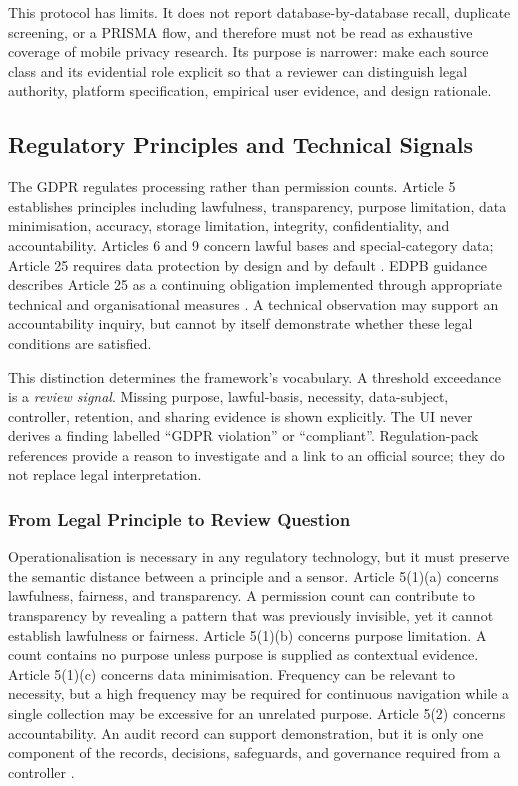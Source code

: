 This protocol has limits. It does not report database-by-database recall, duplicate screening, or a PRISMA flow, and therefore must not be read as exhaustive coverage of mobile privacy research. Its purpose is narrower: make each source class and its evidential role explicit so that a reviewer can distinguish legal authority, platform specification, empirical user evidence, and design rationale.

\subsection{Regulatory Principles and Technical Signals}

The GDPR regulates processing rather than permission counts. Article 5 establishes principles including lawfulness, transparency, purpose limitation, data minimisation, accuracy, storage limitation, integrity, confidentiality, and accountability. Articles 6 and 9 concern lawful bases and special-category data; Article 25 requires data protection by design and by default \cite{eurlex2016}. EDPB guidance describes Article 25 as a continuing obligation implemented through appropriate technical and organisational measures \cite{edpb2019}. A technical observation may support an accountability inquiry, but cannot by itself demonstrate whether these legal conditions are satisfied.

This distinction determines the framework's vocabulary. A threshold exceedance is a \emph{review signal}. Missing purpose, lawful-basis, necessity, data-subject, controller, retention, and sharing evidence is shown explicitly. The UI never derives a finding labelled ``GDPR violation'' or ``compliant''. Regulation-pack references provide a reason to investigate and a link to an official source; they do not replace legal interpretation.

\subsubsection{From Legal Principle to Review Question}

Operationalisation is necessary in any regulatory technology, but it must preserve the semantic distance between a principle and a sensor. Article 5(1)(a) concerns lawfulness, fairness, and transparency. A permission count can contribute to transparency by revealing a pattern that was previously invisible, yet it cannot establish lawfulness or fairness. Article 5(1)(b) concerns purpose limitation. A count contains no purpose unless purpose is supplied as contextual evidence. Article 5(1)(c) concerns data minimisation. Frequency can be relevant to necessity, but a high frequency may be required for continuous navigation while a single collection may be excessive for an unrelated purpose. Article 5(2) concerns accountability. An audit record can support demonstration, but it is only one component of the records, decisions, safeguards, and governance required from a controller \cite{eurlex2016}.

